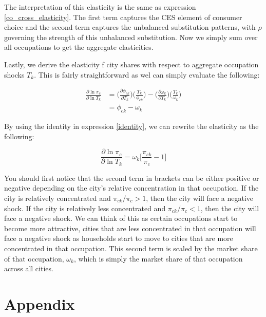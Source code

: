 \documentclass[10pt]{article}
\begin{document}
The interpretation of this elasticity is the same as expression \ref{co_cross_elasticity}. The first term captures the CES element of consumer choice and the second term captures the unbalanced substitution patterns, with $\rho$ governing the strength of this unbalanced substitution. Now we simply sum over all occupations to get the aggregate elasticities.

Lastly, we derive the elasticity f city shares with respect to aggregate occupation shocks $T_k$. This is fairly straightforward as wel can simply evaluate the following:

\begin{align*}
    \frac{\partial\ln{\pi_{c}}}{\partial\ln{T_{k}}} & = \Big(\frac{\partial{\phi_{ck}}}{\partial{T_{k}}}\Big)\Big(\frac{T_{k}}{\phi_{ck}}\Big) - \Big(\frac{\partial{\omega_{k}}}{\partial{T_{k}}}\Big)\Big(\frac{T_{k}}{\omega_{k}}\Big) \\ &= \phi_{ck}-\omega_{k}
\end{align*}

By using the identity in expression \ref{identity}, we can rewrite the elasticity as the following:

\begin{equation}
    \frac{\partial\ln{\pi_{c}}}{\partial\ln{T_{k}}} = {\omega_{k}}\Bigg[\frac{\pi_{ck}}{\pi_{c}}-1\Bigg]
\end{equation}

You should first notice that the second term in brackets can be either positive or negative depending on the city's relative concentration in that occupation. If the city is relatively concentrated and $\pi_{ck} / \pi_c > 1$, then the city will face a negative shock. If the city is relatively less concentrated and $\pi_{ck} / \pi_c < 1$, then the city will face a negative shock. We can think of this as certain occupations start to become more attractive, cities that are less concentrated in that occupation will face a negative shock as households start to move to cities that are more concentrated in that occupation. This second term is scaled by the market share of that occupation, $\omega_k$, which is simply the market share of that occupation across all cities.

\newpage


\newpage

\section{Appendix}
\end{document}
